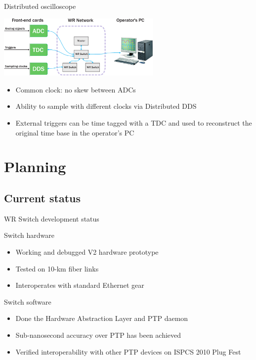 \documentclass[compress,red]{beamer}
\begin{document}
\begin{frame}{Distributed oscilloscope}
  \begin{center}
    \includegraphics[width=8cm]{../../figures/applications/distr_oscill}
    \end{center}
    \begin{block}{}
      \begin{itemize}
      \item Common clock: no skew between ADCs
      \item Ability to sample with different clocks via Distributed DDS
      \item External triggers can be time tagged with a TDC and used to reconstruct the original time base in the operator's PC
      \end{itemize}
    \end{block}
\end{frame}



\section{Planning}

\subsection{Current status}

\begin{frame}{WR Switch development status}
	\begin{block}{Switch hardware}
          \begin{itemize}
            \item Working and debugged V2 hardware prototype
            \item Tested on 10-km fiber links
            \item Interoperates with standard Ethernet gear
            \end{itemize}
            \end{block}

	\begin{block}{Switch software}
          \begin{itemize}
            \item Done the Hardware Abstraction Layer and PTP daemon
            \item Sub-nanosecond accuracy over PTP has been achieved
            \item Verified interoperability with other PTP devices on ISPCS 2010 Plug Fest
            \end{itemize}
          \end{block}
\end{frame}
\end{document}
